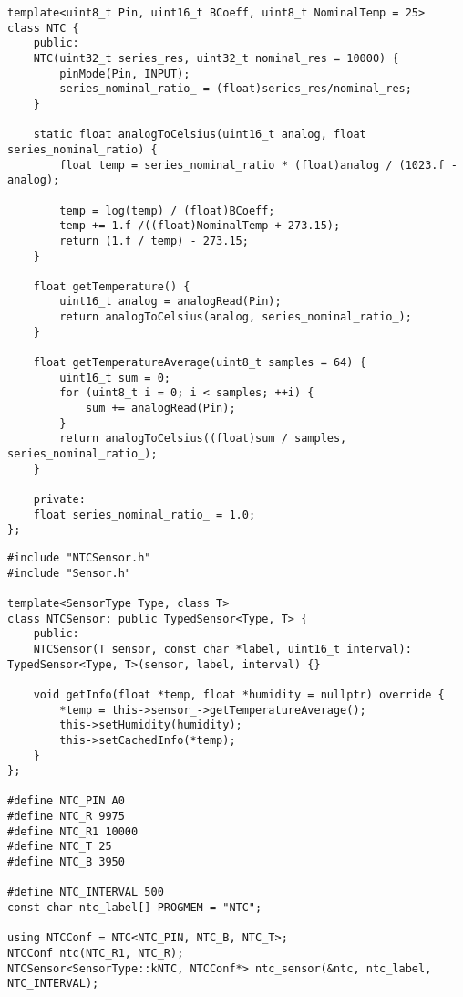\begin{lstlisting}[style=cpp-small, caption=Клас для роботи з термістром, label=lst:ntc]
template<uint8_t Pin, uint16_t BCoeff, uint8_t NominalTemp = 25>
class NTC {
    public:
    NTC(uint32_t series_res, uint32_t nominal_res = 10000) {
        pinMode(Pin, INPUT);
        series_nominal_ratio_ = (float)series_res/nominal_res;
    }

    static float analogToCelsius(uint16_t analog, float series_nominal_ratio) {
        float temp = series_nominal_ratio * (float)analog / (1023.f - analog);

        temp = log(temp) / (float)BCoeff;
        temp += 1.f /((float)NominalTemp + 273.15);
        return (1.f / temp) - 273.15;
    }

    float getTemperature() {
        uint16_t analog = analogRead(Pin);
        return analogToCelsius(analog, series_nominal_ratio_);
    }

    float getTemperatureAverage(uint8_t samples = 64) {
        uint16_t sum = 0;
        for (uint8_t i = 0; i < samples; ++i) {
            sum += analogRead(Pin);
        }
        return analogToCelsius((float)sum / samples, series_nominal_ratio_);
    }

    private:
    float series_nominal_ratio_ = 1.0;
};
\end{lstlisting}

\begin{lstlisting}[style=cpp-small, caption=Клас-спадок базового класу Sensor для роботи з NTC термістром, label=lst:ntc_sensor]
#include "NTCSensor.h"
#include "Sensor.h"

template<SensorType Type, class T>
class NTCSensor: public TypedSensor<Type, T> {
    public:
    NTCSensor(T sensor, const char *label, uint16_t interval): TypedSensor<Type, T>(sensor, label, interval) {}

    void getInfo(float *temp, float *humidity = nullptr) override {
        *temp = this->sensor_->getTemperatureAverage();
        this->setHumidity(humidity);
        this->setCachedInfo(*temp);
    }
};

#define NTC_PIN A0
#define NTC_R 9975
#define NTC_R1 10000
#define NTC_T 25
#define NTC_B 3950

#define NTC_INTERVAL 500
const char ntc_label[] PROGMEM = "NTC";

using NTCConf = NTC<NTC_PIN, NTC_B, NTC_T>;
NTCConf ntc(NTC_R1, NTC_R);
NTCSensor<SensorType::kNTC, NTCConf*> ntc_sensor(&ntc, ntc_label, NTC_INTERVAL);
\end{lstlisting}

